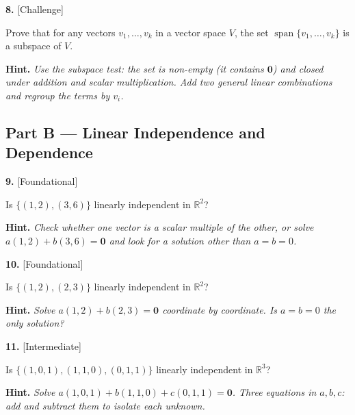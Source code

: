 \documentclass[11pt]{article}
\begin{document}
\begin{minipage}{\linewidth}\textbf{8.} \hfill{\scriptsize\color{ink}[Challenge]}\par\nopagebreak Prove that for any vectors $v_1,\dots,v_k$ in a vector space $V$, the set $\operatorname{span}\{v_1,\dots,v_k\}$ is a subspace of $V$.
\par\smallskip\begingroup\small\color{ink}\textbf{Hint.} \textit{Use the subspace test: the set is non-empty (it contains $\mathbf 0$) and closed under addition and scalar multiplication. Add two general linear combinations and regroup the terms by $v_i$.}\endgroup
\vspace{5.0cm}\end{minipage}\par\vspace{4pt}
\subsection*{\normalsize\color{ink} Part B --- Linear Independence and Dependence}
\begin{minipage}{\linewidth}\textbf{9.} \hfill{\scriptsize\color{ink}[Foundational]}\par\nopagebreak Is $\{(1,2),(3,6)\}$ linearly independent in $\mathbb{R}^{2}$?
\par\smallskip\begingroup\small\color{ink}\textbf{Hint.} \textit{Check whether one vector is a scalar multiple of the other, or solve $a(1,2)+b(3,6)=\mathbf 0$ and look for a solution other than $a=b=0$.}\endgroup
\vspace{2.6cm}\end{minipage}\par\vspace{4pt}
\begin{minipage}{\linewidth}\textbf{10.} \hfill{\scriptsize\color{ink}[Foundational]}\par\nopagebreak Is $\{(1,2),(2,3)\}$ linearly independent in $\mathbb{R}^{2}$?
\par\smallskip\begingroup\small\color{ink}\textbf{Hint.} \textit{Solve $a(1,2)+b(2,3)=\mathbf 0$ coordinate by coordinate. Is $a=b=0$ the only solution?}\endgroup
\vspace{3.0cm}\end{minipage}\par\vspace{4pt}
\begin{minipage}{\linewidth}\textbf{11.} \hfill{\scriptsize\color{ink}[Intermediate]}\par\nopagebreak Is $\{(1,0,1),(1,1,0),(0,1,1)\}$ linearly independent in $\mathbb{R}^{3}$?
\par\smallskip\begingroup\small\color{ink}\textbf{Hint.} \textit{Solve $a(1,0,1)+b(1,1,0)+c(0,1,1)=\mathbf 0$. Three equations in $a,b,c$: add and subtract them to isolate each unknown.}\endgroup
\vspace{4.0cm}\end{minipage}\par\vspace{4pt}
\end{document}
